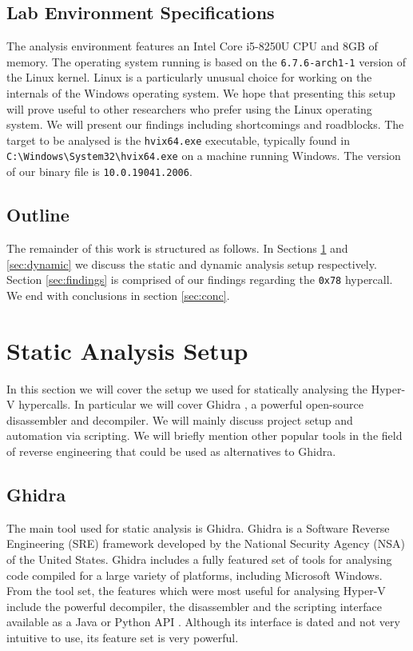 \documentclass[runningheads]{llncs}
\newcommand{\cc}{\lstinline[mathescape]}
\begin{document}
\subsection{Lab Environment Specifications}

The analysis environment features an Intel Core i5-8250U CPU and 8GB of memory.
The operating system running is based on the \cc{6.7.6-arch1-1} version of the
Linux kernel. Linux is a particularly unusual choice for working on the
internals of the Windows operating system. We hope that presenting this setup
will prove useful to other researchers who prefer using the Linux operating
system. We will present our findings including shortcomings and roadblocks. The
target to be analysed is the \cc{hvix64.exe} executable, typically found in
\cc{C:\Windows\System32\hvix64.exe} on a machine running Windows. The version
of our binary file is \cc{10.0.19041.2006}.

\subsection{Outline} 

The remainder of this work is structured as follows. In Sections
\ref{sec:static} and \ref{sec:dynamic} we discuss the static and dynamic
analysis setup respectively. Section \ref{sec:findings} is comprised of our
findings regarding the \cc{0x78} hypercall. We end with conclusions in section
\ref{sec:conc}.

\section{Static Analysis Setup}
\label{sec:static}

In this section we will cover the setup we used for statically analysing the
Hyper-V hypercalls. In particular we will cover Ghidra \cite{ghidra}, a
powerful open-source disassembler and decompiler. We will mainly discuss
project setup and automation via scripting. We will briefly mention other
popular tools in the field of reverse engineering that could be used as
alternatives to Ghidra.

\subsection{Ghidra}

The main tool used for static analysis is Ghidra. Ghidra is a Software Reverse
Engineering (SRE) framework developed by the National Security Agency (NSA) of
the United States. Ghidra includes a fully featured set of tools for analysing
code compiled for a large variety of platforms, including Microsoft Windows.
From the tool set, the features which were most useful for analysing Hyper-V
include the powerful decompiler, the disassembler and the scripting interface
available as a Java or Python API \cite{ghidra}. Although its interface is dated
and not very intuitive to use, its feature set is very powerful.
\end{document}
